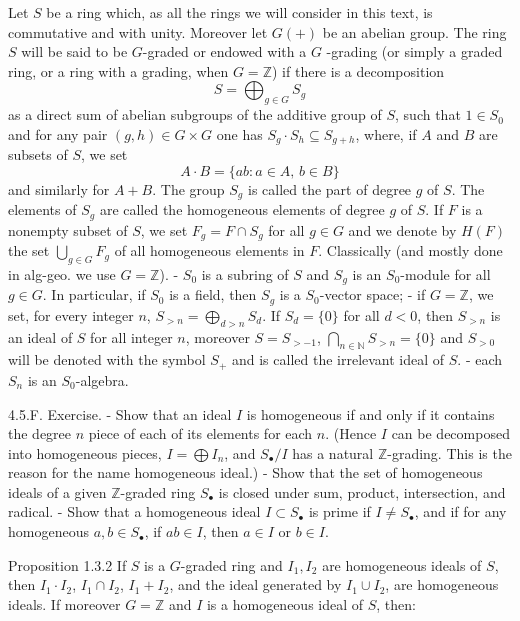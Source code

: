 Let \(S\) be a ring which, as all the rings we will consider in this text, is commutative and with unity. Moreover let \(G(+)\) be an abelian group. The ring \(S\) will be said to be \(G\)-graded or endowed with a \(G\) {-grading} (or simply a graded ring, or a ring with a grading, when \(G = \mathbb{Z}\)) if there is a decomposition
\[
S = \bigoplus_{g \in G} S_g
\]
as a direct sum of abelian subgroups of the additive group of \(S\), such that \(1 \in S_0\) and for any pair \((g, h) \in G \times G\) one has \(S_g \cdot S_h \subseteq S_{g+h}\), where, if \(A\) and \(B\) are subsets of \(S\), we set
\[
A \cdot B = \{ ab : a \in A,\, b \in B \}
\]
and similarly for \(A + B\). The group \(S_g\) is called the part of degree \(g\) of \(S\). 
The elements of \(S_g\) are called the homogeneous elements of degree \(g\) of \(S\). 
If \(F\) is a nonempty subset of \(S\), we set \(F_g = F \cap S_g\) for all \(g \in G\) and we denote by \(H(F)\) the set \(\bigcup_{g \in G} F_g\) of all homogeneous elements in \(F\).
Classically (and mostly done in alg-geo. we use \( G = \mathbb{Z} \)).
- \(S_0\) is a subring of \(S\) and \(S_g\) is an \(S_0\)-module for all \(g \in G\). In particular, if \(S_0\) is a field, then \(S_g\) is a \(S_0\)-vector space;
- if \(G = \mathbb{Z}\), we set, for every integer \(n\), \(S_{>n} = \bigoplus_{d > n} S_d\). If \(S_d = \{0\}\) for all \(d < 0\), then \(S_{>n}\) is an ideal of \(S\) for all integer \(n\), moreover \(S = S_{>-1}\), \(\bigcap_{n \in \mathbb{N}} S_{>n} = \{0\}\) and \(S_{>0}\) will be denoted with the symbol \(S_+\) and is called the  irrelevant ideal of \(S\).
- each \( S_n \) is an \( S_0 \)-algebra.

4.5.F. Exercise.
- Show that an ideal \(I\) is homogeneous if and only if it contains the degree \(n\) piece of each of its elements for each \(n\). (Hence \(I\) can be decomposed into homogeneous pieces, \(I = \bigoplus I_n\), and \(S_{\bullet} / I\) has a natural \(\mathbb{Z}\)-grading. This is the reason for the name homogeneous ideal.)
- Show that the set of homogeneous ideals of a given \(\mathbb{Z}\)-graded ring \(S_{\bullet}\) is closed under sum, product, intersection, and radical.
- Show that a homogeneous ideal \(I \subset S_{\bullet}\) is prime if \(I \neq S_{\bullet}\), and if for any homogeneous \(a, b \in S_{\bullet}\), if \(ab \in I\), then \(a \in I\) or \(b \in I\).


Proposition 1.3.2  If \(S\) is a \(G\)-graded ring and \(I_1, I_2\) are homogeneous ideals of \(S\), then \(I_1 \cdot I_2\), \(I_1 \cap I_2\), \(I_1 + I_2\), and the ideal generated by \(I_1 \cup I_2\), are homogeneous ideals. If moreover \(G = \mathbb{Z}\) and \(I\) is a homogeneous ideal of \(S\), then:

